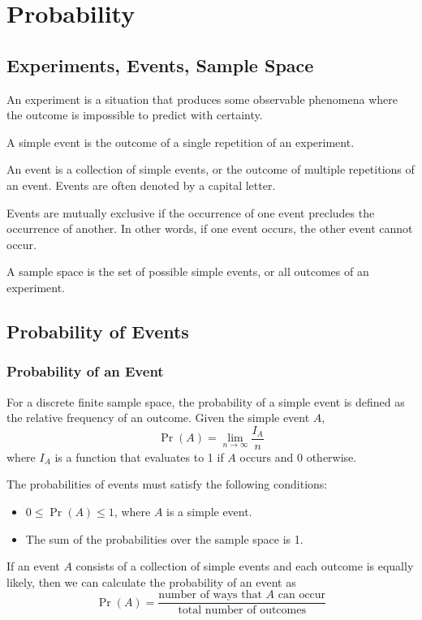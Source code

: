 \documentclass{article}
\begin{document}
\section{Probability}
\subsection{Experiments, Events, Sample Space}
\begin{definition}[Experiment]
    An experiment is a situation that produces some observable phenomena where the outcome is impossible to predict with certainty.
\end{definition}
\begin{definition}
    A simple event is the outcome of a single repetition of an experiment.
\end{definition}
\begin{definition}[Event]
    An event is a collection of simple events, or the outcome of multiple repetitions of an event.
    Events are often denoted by a capital letter.
\end{definition}
\begin{definition}
    Events are mutually exclusive if the occurrence of one event precludes the occurrence of another.
    In other words, if one event occurs, the other event cannot occur.
\end{definition}
\begin{definition}
    A sample space is the set of possible simple events, or all outcomes of an experiment.
\end{definition}
\subsection{Probability of Events}
\subsubsection{Probability of an Event}
For a discrete finite sample space, the probability of a simple event is defined as the relative
frequency of an outcome. Given the simple event \(A\),
\begin{equation*}
    \Pr{\left( A \right)} = \lim_{n \to \infty} \frac{I_A}{n}
\end{equation*}
where \(I_A\) is a function that evaluates to 1 if \(A\) occurs and 0 otherwise.

The probabilities of events must satisfy the following conditions:
\begin{itemize}
    \item \(0 \leq \Pr{\left( A \right)} \leq 1\), where \(A\) is a simple event.
    \item The sum of the probabilities over the sample space is 1.
\end{itemize}
If an event \(A\) consists of a collection of simple events and each outcome is
equally likely, then we can calculate the probability of an event as
\begin{equation*}
    \Pr{\left( A \right)} = \frac{\text{number of ways that \(A\) can occur}}{\text{total number of outcomes}}
\end{equation*}
\end{document}
